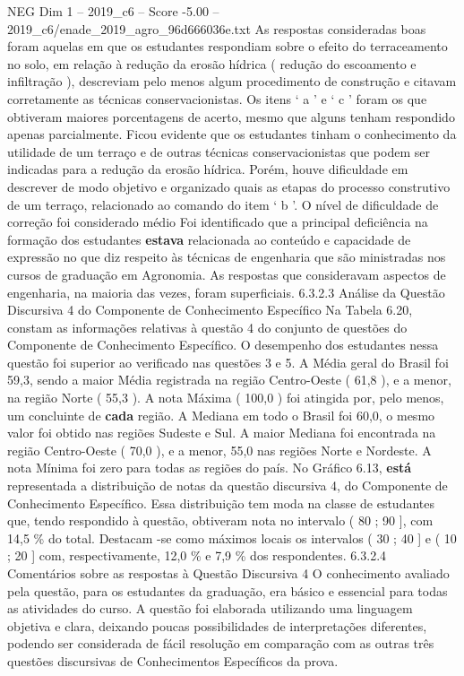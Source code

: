 \begin{textsample}{NEG Dim 1 – 2019\_c6 – Score -5.00 – 2019\_c6/enade\_2019\_agro\_96d666036e.txt}
As respostas consideradas boas foram aquelas em que os estudantes respondiam sobre o efeito do terraceamento no solo, em relação à redução da erosão hídrica ( redução do escoamento e infiltração ), descreviam pelo menos algum procedimento de construção e citavam corretamente as técnicas conservacionistas.
Os itens ‘ a ’ e ‘ c ’ foram os que obtiveram maiores porcentagens de acerto, mesmo que alguns tenham respondido apenas parcialmente.
Ficou evidente que os estudantes tinham o conhecimento da utilidade de um terraço e de outras técnicas conservacionistas que podem ser indicadas para a redução da erosão hídrica.
Porém, houve dificuldade em descrever de modo objetivo e organizado quais as etapas do processo construtivo de um terraço, relacionado ao comando do item ‘ b ’.
O nível de dificuldade de correção foi considerado médio Foi identificado que a principal deficiência na formação dos estudantes \textbf{estava} relacionada ao conteúdo e capacidade de expressão no que diz respeito às técnicas de engenharia que são ministradas nos cursos de graduação em Agronomia.
As respostas que consideravam aspectos de engenharia, na maioria das vezes, foram superficiais. 6.3.2.3 Análise da Questão Discursiva 4 do Componente de Conhecimento Específico Na Tabela 6.20, constam as informações relativas à questão 4 do conjunto de questões do Componente de Conhecimento Específico.
O desempenho dos estudantes nessa questão foi superior ao verificado nas questões 3 e 5.
A Média geral do Brasil foi 59,3, sendo a maior Média registrada na região Centro-Oeste ( 61,8 ), e a menor, na região Norte ( 55,3 ).
A nota Máxima ( 100,0 ) foi atingida por, pelo menos, um concluinte de \textbf{cada} região.
A Mediana em todo o Brasil foi 60,0, o mesmo valor foi obtido nas regiões Sudeste e Sul.
A maior Mediana foi encontrada na região Centro-Oeste ( 70,0 ), e a menor, 55,0 nas regiões Norte e Nordeste.
A nota Mínima foi zero para todas as regiões do país.
No Gráfico 6.13, \textbf{está} representada a distribuição de notas da questão discursiva 4, do Componente de Conhecimento Específico.
Essa distribuição tem moda na classe de estudantes que, tendo respondido à questão, obtiveram nota no intervalo ( 80 ; 90 ], com 14,5 \% do total.
Destacam -se como máximos locais os intervalos ( 30 ; 40 ] e ( 10 ; 20 ] com, respectivamente, 12,0 \% e 7,9 \% dos respondentes. 6.3.2.4 Comentários sobre as respostas à Questão Discursiva 4 O conhecimento avaliado pela questão, para os estudantes da graduação, era básico e essencial para todas as atividades do curso.
A questão foi elaborada utilizando uma linguagem objetiva e clara, deixando poucas possibilidades de interpretações diferentes, podendo ser considerada de fácil resolução em comparação com as outras três questões discursivas de Conhecimentos Específicos da prova.

\end{textsample}

